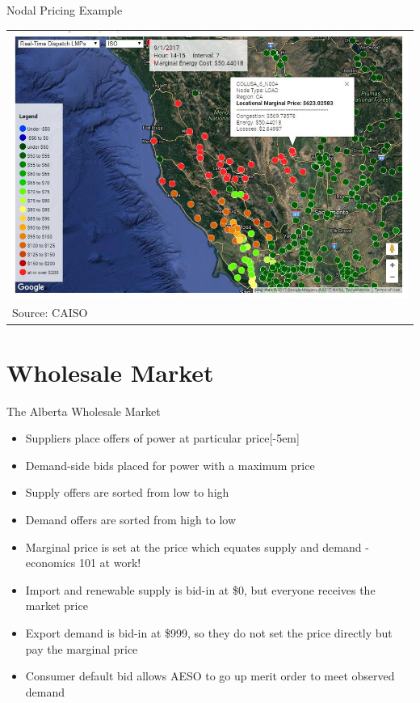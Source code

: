 \documentclass[aspectratio=169]{beamer}
\renewcommand{\(}{\begin{columns}}
\renewcommand{\)}{\end{columns}}
\newcommand{\<}[1]{\begin{column}{#1}}
\renewcommand{\>}{\end{column}}
\begin{document}
\begin{frame}{Nodal Pricing Example}

\begin{tabular}{p{\linewidth}}
    \centering
    \includegraphics[width=.7\linewidth]{../images/cali_nodes.png} \\[.1\abovecaptionskip]
  Source: CAISO
\end{tabular}
\vfill
\end{frame}

\section{Wholesale Market}

\begin{frame}{The Alberta Wholesale Market}
\begin{itemize}
\item Suppliers place offers of power at particular price[-5em]
\item Demand-side bids placed for power with a maximum price
\item Supply offers are sorted from low to high
\item Demand offers are sorted from high to low
\item Marginal price is set at the price which equates supply and demand - economics 101 at work!
\item Import and renewable supply is bid-in at \$0, but everyone receives the market price
\item Export demand is bid-in at \$999, so they do not set the price directly but pay the marginal price
\item Consumer default bid allows AESO to go up merit order to meet observed demand
\end{itemize}

\vfill \end{frame}
\end{document}
